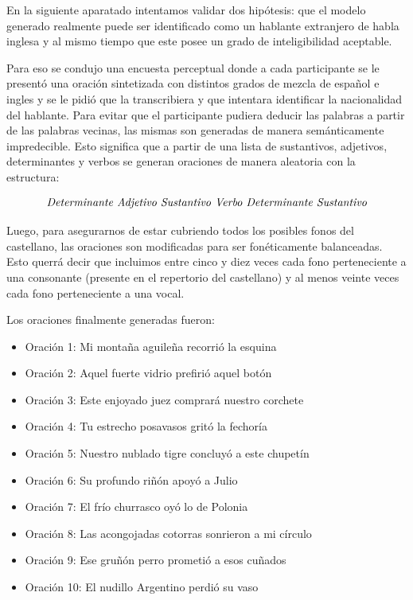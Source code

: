 
En la siguiente aparatado intentamos validar dos hipótesis: que el modelo generado realmente puede ser identificado como un hablante extranjero de habla inglesa y al mismo tiempo que este posee un grado de inteligibilidad aceptable.

Para eso se condujo una encuesta perceptual donde a cada participante se le presentó una oración sintetizada con distintos grados de mezcla de español e ingles y se le pidió que la transcribiera y que intentara identificar la nacionalidad del hablante. Para evitar que el participante pudiera deducir las palabras a partir de las palabras vecinas, las mismas son generadas de manera semánticamente impredecible. Esto significa que a partir de una lista de sustantivos, adjetivos, determinantes y verbos se generan oraciones de manera aleatoria con la estructura:

$$\textnormal{\textit{Determinante Adjetivo Sustantivo Verbo Determinante Sustantivo}}$$

Luego, para asegurarnos de estar cubriendo todos los posibles fonos del castellano, las oraciones son modificadas para ser fonéticamente balanceadas. Esto querrá decir que incluimos entre cinco y diez veces cada fono perteneciente a una consonante (presente en el repertorio del castellano) y al menos veinte veces cada fono perteneciente a una vocal.

Los oraciones finalmente generadas fueron:

\begin{itemize}
\item Oración 1: Mi montaña aguileña recorrió la esquina
\item Oración 2: Aquel fuerte vidrio prefirió aquel botón
\item Oración 3: Este enjoyado juez comprará nuestro corchete
\item Oración 4: Tu estrecho posavasos gritó la fechoría
\item Oración 5: Nuestro nublado tigre concluyó a este chupetín
\item Oración 6: Su profundo riñón apoyó a Julio
\item Oración 7: El frío churrasco oyó lo de Polonia
\item Oración 8: Las acongojadas cotorras sonrieron a mi círculo
\item Oración 9: Ese gruñón perro prometió a esos cuñados
\item Oración 10: El nudillo Argentino perdió su vaso
\end{itemize}

